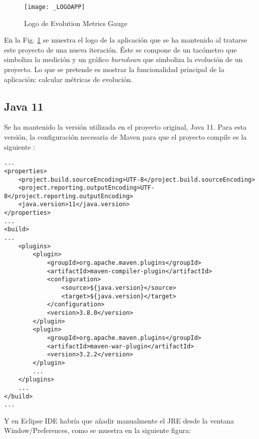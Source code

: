 \begin{figure}[!h]
	\centering
	\texttt{[image: \_LOGOAPP]}
	\caption{Logo de Evolution Metrics Gauge}\label{fig:_LOGOAPP}
\end{figure}
\FloatBarrier

En la Fig. \ref{fig:_LOGOAPP} se muestra el logo de la aplicación que se ha mantenido al tratarse este proyecto de una nueva iteración. Éste se compone de un tacómetro que simboliza la medición y un gráfico \textit{burndown} que simboliza la evolución de un proyecto. Lo que se pretende es mostrar la funcionalidad principal de la aplicación: calcular métricas de evolución.


\subsection{Java 11}
Se ha mantenido la versión utilizada en el proyecto original\cite{TFGPrevio}, Java 11.
Para esta versión, la configuración necesaria de Maven para que el proyecto compile es la siguiente :


\begin{minipage}{\linewidth}
{\tiny
\begin{verbatim}
...
<properties>
	<project.build.sourceEncoding>UTF-8</project.build.sourceEncoding>
	<project.reporting.outputEncoding>UTF-8</project.reporting.outputEncoding>
	<java.version>11</java.version>
</properties>
...
<build>
...
	<plugins>
		<plugin>
			<groupId>org.apache.maven.plugins</groupId>
			<artifactId>maven-compiler-plugin</artifactId>
			<configuration>
				<source>${java.version}</source>
				<target>${java.version}</target>
			</configuration>
			<version>3.8.0</version>
		</plugin>
		<plugin>
			<groupId>org.apache.maven.plugins</groupId>
			<artifactId>maven-war-plugin</artifactId>
			<version>3.2.2</version>
		</plugin>
		...
	</plugins>
	...
</build>
...
\end{verbatim}
}
\end{minipage}

Y en Eclipse IDE habría que añadir manualmente el JRE desde la ventana Window/Preferences, como se muestra en la siguiente figura: %


